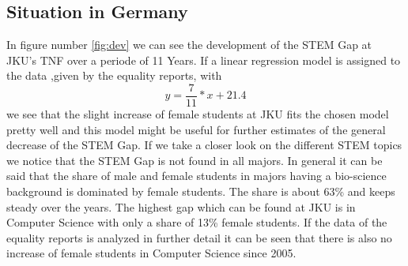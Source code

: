 \documentclass[12pt]{article}
\begin{document}
\subsection{Situation in Germany}
In figure number \ref{fig:dev} we can see the development of the STEM Gap at JKU's TNF over a periode of 11 Years. If   a linear regression model is assigned to the data ,given by the equality reports, with 
\begin{equation}
y= \frac{7}{11}*x+21.4
\end{equation}  we see that the slight increase of female students at JKU fits the chosen model pretty well and this model might be useful for further estimates of the general decrease of the STEM Gap.
If we take a closer look on the different STEM topics we notice that the STEM Gap is not found in all majors. In general it can be said that the share of male and female students in majors having a bio-science background   is dominated by female students. The share is about 63\% and keeps steady over the years. 
The highest gap which can be found at JKU is in Computer Science with only a share of 13\% female students. If the data of the equality reports is analyzed in further detail it can be seen that there is also no increase of female students in Computer Science since 2005. 

\newpage


\newpage
\listoffigures
\listoftables
\end{document}
